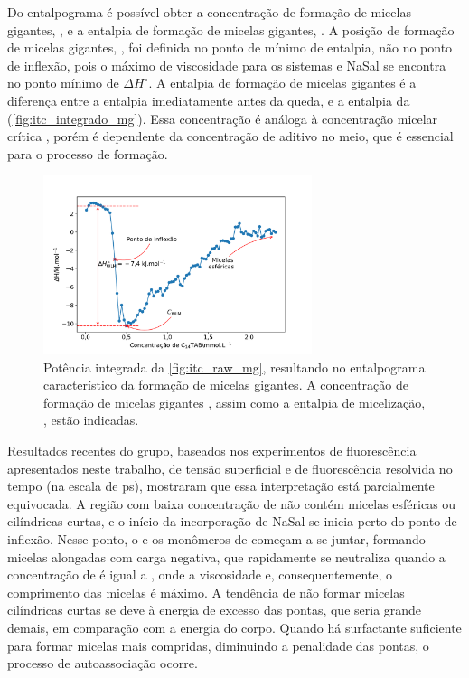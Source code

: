 		Do entalpograma é possível obter a concentração de formação de micelas gigantes, \cwlm, e a entalpia de formação de micelas gigantes, \DHwlm. A posição de formação de micelas gigantes, \cwlm, foi definida no ponto de mínimo de entalpia, não no ponto de inflexão, pois o máximo de viscosidade para os sistemas \TTAB{} e NaSal se encontra no ponto mínimo de \(\Delta H^\circ\). \cite{Ito2015c} A entalpia de formação de micelas gigantes \DHwlm{} é a diferença entre a entalpia imediatamente antes da queda, e a entalpia da \cwlm (\autoref{fig:itc_integrado_mg}). Essa concentração é análoga à concentração micelar crítica \cmc, porém é dependente da concentração de aditivo no meio, que é essencial para o processo de formação.

		
		\begin{figure}[h]
			\centering
			\includegraphics[width=0.7\textwidth]{imagens/itc/exemplo_integrado_mg}
			\caption{Potência integrada da \autoref{fig:itc_raw_mg}, resultando no entalpograma característico da formação de micelas gigantes. A concentração de formação de micelas gigantes \cwlm, assim como a entalpia de micelização, \DHwlm, estão indicadas.}
			\label{fig:itc_integrado_mg}
		\end{figure}
		
		Resultados recentes do grupo, baseados nos experimentos de fluorescência apresentados neste trabalho, de tensão superficial e de fluorescência resolvida no tempo (na escala de ps), mostraram que essa interpretação está parcialmente equivocada. A região com baixa concentração de \TTAB{} não contém micelas esféricas ou cilíndricas curtas, e o início da incorporação de NaSal se inicia perto do ponto de inflexão. Nesse ponto, o \Sal{} e os monômeros de \TTAB{} começam a se juntar, formando micelas alongadas com carga negativa, que rapidamente se neutraliza quando a concentração de \TTAB{} é igual a \cwlm, onde a viscosidade e, consequentemente, o comprimento das micelas é máximo. A tendência de não formar micelas cilíndricas curtas se deve à energia de excesso das pontas, que seria grande demais, em comparação com a energia do corpo. Quando há surfactante suficiente para formar micelas mais compridas, diminuindo a penalidade das pontas, o processo de autoassociação ocorre. %
		

